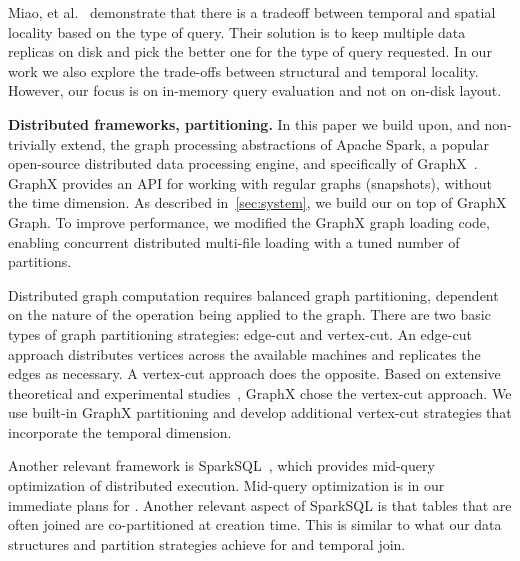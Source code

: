 Miao, et al.~\cite{DBLP:journals/tos/MiaoHLWYZPCC15} demonstrate that
there is a tradeoff between temporal and spatial locality based on the
type of query.  Their solution is to keep multiple data replicas on
disk and pick the better one for the type of query requested.  In our
work we also explore the trade-offs between structural and temporal
locality.  However, our focus is on in-memory query evaluation and not
on on-disk layout.

{\bf Distributed frameworks, partitioning.}  In this paper we build
upon, and non-trivially extend, the graph processing abstractions of
Apache Spark, a popular open-source distributed data processing
engine, and specifically of
GraphX~\cite{DBLP:conf/osdi/GonzalezXDCFS14}.  GraphX provides an API
for working with regular graphs (snapshots), without the time
dimension.  As described in~\ref{sec:system}, we build our \tgs on top
of GraphX Graph.  To improve performance, we modified the GraphX graph
loading code, enabling concurrent distributed multi-file loading with
a tuned number of partitions.  

Distributed graph computation requires balanced graph partitioning,
dependent on the nature of the operation being applied to the graph.
There are two basic types of graph partitioning strategies: edge-cut
and vertex-cut.  An edge-cut approach distributes vertices across the
available machines and replicates the edges as necessary.  A
vertex-cut approach does the opposite.  Based on extensive theoretical
and experimental studies~\cite{Gonzalez2012}, GraphX chose the
vertex-cut approach.  We use built-in GraphX partitioning and develop
additional vertex-cut strategies that incorporate the temporal
dimension.

Another relevant framework is SparkSQL~\cite{Xin2013}, which provides
mid-query optimization of distributed execution.  Mid-query
optimization is in our immediate plans for \ql.  Another relevant
aspect of SparkSQL is that tables that are often joined are
co-partitioned at creation time.  This is similar to what our data
structures and partition strategies achieve for  and
temporal join.


